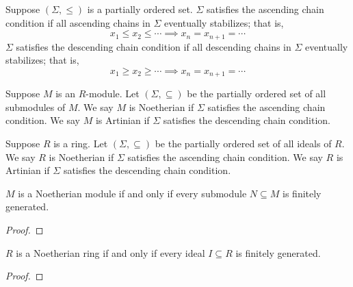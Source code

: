\begin{definition}
    Suppose \((\Sigma,\leq)\) is a partially ordered set.
    \(\Sigma\) satisfies the ascending chain condition
    if all ascending chains in \(\Sigma\) eventually stabilizes; that is,
    \begin{equation*}
        x_1 \leq x_2 \leq \cdots \implies x_n = x_{n+1} = \cdots
    \end{equation*}
    \(\Sigma\) satisfies the descending chain condition
    if all descending chains in \(\Sigma\) eventually stabilizes; that is,
    \begin{equation*}
        x_1 \geq x_2 \geq \cdots \implies x_n = x_{n+1} = \cdots
    \end{equation*}
\end{definition}
\begin{definition}
    Suppose \(M\) is an \(R\)-module.
    Let \((\Sigma, \subseteq)\) be the partially ordered set of all submodules of \(M\).
    We say \(M\) is Noetherian if \(\Sigma\) satisfies the ascending chain condition.
    We say \(M\) is Artinian if \(\Sigma\) satisfies the descending chain condition.
\end{definition}
\begin{definition}
    Suppose \(R\) is a ring.
    Let \((\Sigma, \subseteq)\) be the partially ordered set of all ideals of \(R\).
    We say \(R\) is Noetherian if \(\Sigma\) satisfies the ascending chain condition.
    We say \(R\) is Artinian if \(\Sigma\) satisfies the descending chain condition.
\end{definition}

\begin{theorem}
    \(M\) is a Noetherian module if and only if every submodule \(N \subseteq M\) is finitely generated.
\end{theorem}
\begin{proof}
    
\end{proof}
\begin{corollary}
    \(R\) is a Noetherian ring if and only if every ideal \(I \subseteq R\) is finitely generated.
\end{corollary}
\begin{proof}
    
\end{proof}

